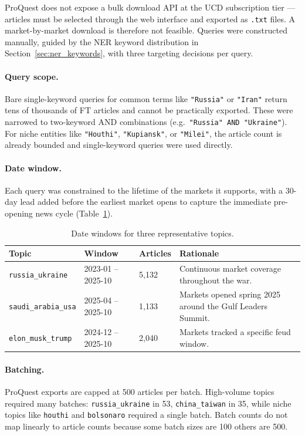 \documentclass[11pt,a4paper]{article}
\begin{document}
ProQuest does not expose a bulk download API at the UCD subscription
tier --- articles must be selected through the web interface and
exported as \texttt{.txt} files. A market-by-market download is
therefore not feasible. Queries were constructed manually, guided by
the NER keyword distribution in Section~\ref{sec:ner_keywords}, with
three targeting decisions per query.

\paragraph{Query scope.} Bare single-keyword queries for common
terms like \texttt{"Russia"} or \texttt{"Iran"} return tens of
thousands of FT articles and cannot be practically exported. These
were narrowed to two-keyword AND combinations (e.g.\
\texttt{"Russia" AND "Ukraine"}). For niche entities like
\texttt{"Houthi"}, \texttt{"Kupiansk"}, or \texttt{"Milei"}, the
article count is already bounded and single-keyword queries were
used directly.

\paragraph{Date window.} Each query was constrained to the lifetime
of the markets it supports, with a 30-day lead added before the
earliest market opens to capture the immediate pre-opening news
cycle (Table~\ref{tab:date_windows}).

\begin{table}[H]
\centering
\caption{Date windows for three representative topics.}
\label{tab:date_windows}
\small
\begin{tabularx}{\textwidth}{l l l X}
\toprule
\textbf{Topic} & \textbf{Window} & \textbf{Articles} & \textbf{Rationale} \\
\midrule
\texttt{russia\_ukraine}    & 2023-01 -- 2025-10 & 5{,}132
    & Continuous market coverage throughout the war. \\
\addlinespace[3pt]
\texttt{saudi\_arabia\_usa} & 2025-04 -- 2025-10 & 1{,}133
    & Markets opened spring 2025 around the Gulf Leaders Summit. \\
\addlinespace[3pt]
\texttt{elon\_musk\_trump}  & 2024-12 -- 2025-10 & 2{,}040
    & Markets tracked a specific feud window. \\
\bottomrule
\end{tabularx}
\end{table}

\paragraph{Batching.} ProQuest exports are capped at 500 articles
per batch. High-volume topics required many batches:
\texttt{russia\_ukraine} in 53, \texttt{china\_taiwan} in 35, while
niche topics like \texttt{houthi} and \texttt{bolsonaro} required
a single batch. Batch counts do not map linearly to article counts
because some batch sizes are 100 others are 500.
\end{document}
